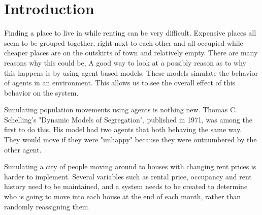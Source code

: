 \section{Introduction}

\par
Finding a place to live in while renting can be very difficult. Expensive places all seem to be grouped together, right next to each other and all occupied while cheaper places are on the outskirts of town and relatively empty. There are many reasons why this could be, A good way to look at a possibly reason as to why this happens is by using agent based models\cite{abm-wiki}. These models simulate the behavior of agents in an environment. This allows us to see the overall effect of this behavior on the system.


\par
Simulating population movements using agents is nothing new. Thomas C. Schelling's "Dynamic Models of Segregation", published in 1971, was among the first to do this. His model had two agents that both behaving the same way. They would move if they were "unhappy" because they were outnumbered by the other agent.

\par
Simulating a city of people moving around to houses with changing rent prices is harder to implement. Several variables such as rental price, occupancy and rent history need to be maintained, and a system needs to be created to determine who is going to move into each house at the end of each month, rather than randomly reassigning them.

